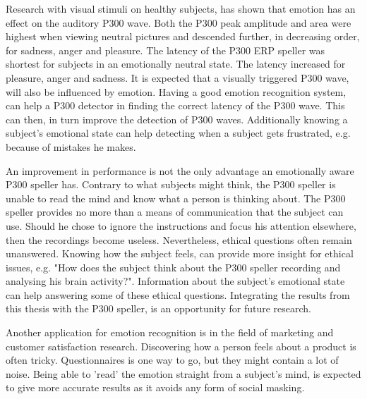 
Research with visual stimuli on healthy subjects, has shown that emotion has an effect on the auditory P300 wave\cite{AuditoryP300Effect}. Both the P300 peak amplitude and area were highest when viewing neutral pictures and descended further, in decreasing order, for sadness, anger and pleasure. The latency of the P300 ERP speller was shortest for subjects in an emotionally neutral state. The latency increased for pleasure, anger and sadness. It is expected that a visually triggered P300 wave, will also be influenced by emotion. Having a good emotion recognition system, can help a P300 detector in finding the correct latency of the P300 wave. This can then, in turn improve the detection of P300 waves. Additionally knowing a subject's emotional state can help detecting when a subject gets frustrated, e.g. because of mistakes he makes.

\npar

An improvement in performance is not the only advantage an emotionally aware P300 speller has. Contrary to what subjects might think, the P300 speller is unable to read the mind and know what a person is thinking about\cite{P300Origin}. The P300 speller provides no more than a means of communication that the subject can use. Should he chose to ignore the instructions and focus his attention elsewhere, then the recordings become useless. Nevertheless, ethical questions often remain unanswered. Knowing how the subject feels, can provide more insight for ethical issues, e.g. "How does the subject think about the P300 speller recording and analysing his brain activity?". Information about the subject's emotional state can help answering some of these ethical questions. Integrating the results from this thesis with the P300 speller, is an opportunity for future research.

\npar

Another application for emotion recognition is in the field of marketing and customer satisfaction research. Discovering how a person feels about a product is often tricky. Questionnaires is one way to go, but they might contain a lot of noise. Being able to 'read' the emotion straight from a subject's mind, is expected to give more accurate results as it avoids any form of social masking. %
